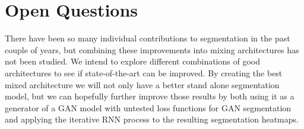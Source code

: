 \section{Open Questions}
There have been so many individual contributions to segmentation in the past couple of years, but combining these improvements into mixing architectures has not been studied. We intend to explore different combinations of good architectures to see if state-of-the-art can be improved. By creating the best mixed architecture we will not only have a better stand alone segmentation model, but we can hopefully further improve those results by both using it as a generator of a GAN model with untested loss functions for GAN segmentation and applying the iterative RNN process to the resulting segmentation heatmaps.
